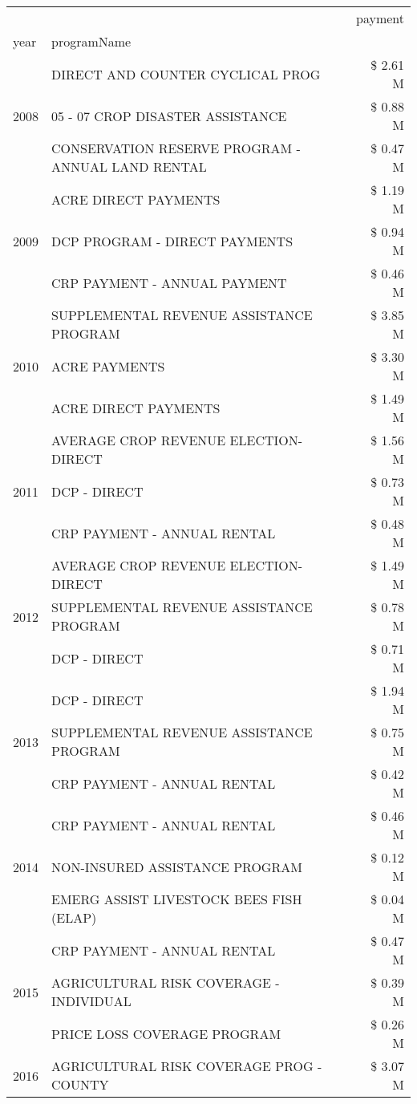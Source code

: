 \begin{tabular}{llr}
\toprule
 &  & payment \\
year & programName &  \\
\midrule
\multirow[t]{3}{*}{2008} & DIRECT AND COUNTER CYCLICAL PROG & \$ 2.61 M \\
 & 05 - 07 CROP DISASTER ASSISTANCE & \$ 0.88 M \\
 & CONSERVATION RESERVE PROGRAM - ANNUAL LAND RENTAL & \$ 0.47 M \\
\cline{1-3}
\multirow[t]{3}{*}{2009} & ACRE DIRECT PAYMENTS & \$ 1.19 M \\
 & DCP PROGRAM - DIRECT PAYMENTS & \$ 0.94 M \\
 & CRP PAYMENT - ANNUAL PAYMENT & \$ 0.46 M \\
\cline{1-3}
\multirow[t]{3}{*}{2010} & SUPPLEMENTAL REVENUE ASSISTANCE PROGRAM & \$ 3.85 M \\
 & ACRE PAYMENTS & \$ 3.30 M \\
 & ACRE DIRECT PAYMENTS & \$ 1.49 M \\
\cline{1-3}
\multirow[t]{3}{*}{2011} & AVERAGE CROP REVENUE ELECTION-DIRECT & \$ 1.56 M \\
 & DCP - DIRECT & \$ 0.73 M \\
 & CRP PAYMENT - ANNUAL RENTAL & \$ 0.48 M \\
\cline{1-3}
\multirow[t]{3}{*}{2012} & AVERAGE CROP REVENUE ELECTION-DIRECT & \$ 1.49 M \\
 & SUPPLEMENTAL REVENUE ASSISTANCE PROGRAM & \$ 0.78 M \\
 & DCP - DIRECT & \$ 0.71 M \\
\cline{1-3}
\multirow[t]{3}{*}{2013} & DCP - DIRECT & \$ 1.94 M \\
 & SUPPLEMENTAL REVENUE ASSISTANCE PROGRAM & \$ 0.75 M \\
 & CRP PAYMENT - ANNUAL RENTAL & \$ 0.42 M \\
\cline{1-3}
\multirow[t]{3}{*}{2014} & CRP PAYMENT - ANNUAL RENTAL & \$ 0.46 M \\
 & NON-INSURED ASSISTANCE PROGRAM & \$ 0.12 M \\
 & EMERG ASSIST LIVESTOCK BEES FISH (ELAP) & \$ 0.04 M \\
\cline{1-3}
\multirow[t]{3}{*}{2015} & CRP PAYMENT - ANNUAL RENTAL & \$ 0.47 M \\
 & AGRICULTURAL RISK COVERAGE - INDIVIDUAL & \$ 0.39 M \\
 & PRICE LOSS COVERAGE PROGRAM & \$ 0.26 M \\
\cline{1-3}
\multirow[t]{3}{*}{2016} & AGRICULTURAL RISK COVERAGE PROG - COUNTY      & \$ 3.07 M \\

\end{tabular}
